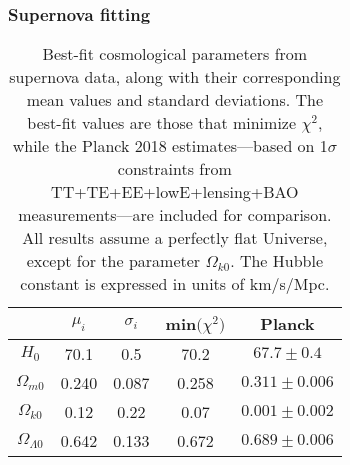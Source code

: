 \documentclass{aa}
\numberwithin{equation}{section}
\numberwithin{table}{section}
\numberwithin{figure}{section}
\begin{document}
\subsubsection{Supernova fitting}

\begin{table}
  \caption{Best-fit cosmological parameters from supernova data, along with their corresponding mean values and standard deviations. The best-fit values are those that minimize $\chi^2$, while the Planck 2018 estimates—based on 1$\sigma$ constraints from TT+TE+EE+lowE+lensing+BAO measurements—are included for comparison. All results assume a perfectly flat Universe, except for the parameter $\Omega_{k0}$. The Hubble constant is expressed in units of km/s/Mpc.}             %
  \label{table:supernova}      %
  \centering                          %
  \begin{tabular}{| c || c | c | c | c |}        %
  \hline                %
   & \hspace{5pt}$\mu_i$\hspace{5pt} & \hspace{7pt}$\sigma_i$\hspace{7pt} & min$\big(\chi^2\big)$ & Planck \\    %
  \hline\hline                     %
  $H_0$ & \hspace{-10pt}70.1 & \hspace{-10.2pt}0.5 & \hspace{-10.8pt}70.2 & \hspace{-5.5pt}$67.7\pm0.4$ \\
  \hline
  $\Omega_{m0}$ & \hspace{4.8pt}0.240 & \hspace{-0.2pt}0.087 & \hspace{4.6pt}0.258 & $0.311\pm0.006$ \\
  \hline
  $\Omega_{k0}$ & \hspace{0pt}0.12 & \hspace{-5pt}0.22 & \hspace{0pt}0.07 & $0.001\pm0.002$ \\
  \hline
  $\Omega_{\Lambda0}$ & \hspace{5pt}0.642 & 0.133 & \hspace{5pt}0.672 & $0.689\pm0.006$ \\
  \hline                                   %
  \end{tabular}
\end{table}
\end{document}
